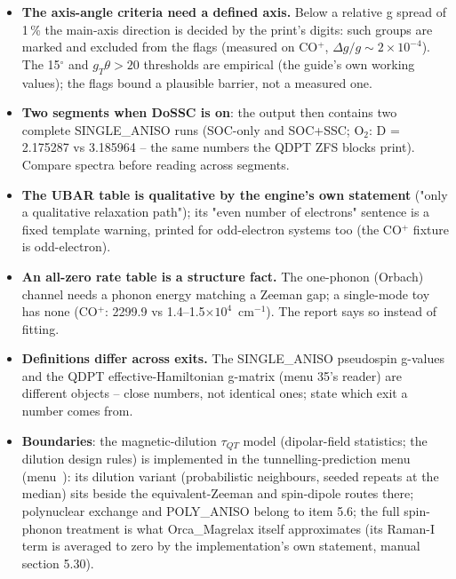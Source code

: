 \begin{readbox}
\begin{itemize}
  \item \textbf{The axis-angle criteria need a defined axis.}  Below a
    relative g spread of 1\,\% the main-axis direction is decided by the
    print's digits: such groups are marked and excluded from the flags
    (measured on CO$^+$, $\Delta g/g \sim 2\times10^{-4}$).  The 15$^\circ$
    and $g_T\theta > 20$ thresholds are empirical (the guide's own
    working values); the flags bound a plausible barrier, not a measured
    one.
  \item \textbf{Two segments when DoSSC is on}: the output then contains
    two complete SINGLE\_ANISO runs (SOC-only and SOC+SSC; O$_2$: D =
    2.175287 vs 3.185964 -- the same numbers the QDPT ZFS blocks print).
    Compare spectra before reading across segments.
  \item \textbf{The UBAR table is qualitative by the engine's own
    statement} ("only a qualitative relaxation path"); its "even number
    of electrons" sentence is a fixed template warning, printed for
    odd-electron systems too (the CO$^+$ fixture is odd-electron).
  \item \textbf{An all-zero rate table is a structure fact.}  The
    one-phonon (Orbach) channel needs a phonon energy matching a Zeeman
    gap; a single-mode toy has none (CO$^+$: 2299.9 vs
    1.4--1.5$\times10^4$~cm$^{-1}$).  The report says so instead of
    fitting.
  \item \textbf{Definitions differ across exits.}  The SINGLE\_ANISO
    pseudospin g-values and the QDPT effective-Hamiltonian g-matrix
    (menu 35's reader) are different objects -- close numbers, not
    identical ones; state which exit a number comes from.
  \item \textbf{Boundaries}: the magnetic-dilution $\tau_{QT}$ model
    (dipolar-field statistics; the dilution design rules) is implemented
    in the tunnelling-prediction menu (menu~): its dilution
    variant (probabilistic neighbours, seeded repeats at the median)
    sits beside the equivalent-Zeeman and spin-dipole routes there;
    polynuclear exchange and POLY\_ANISO belong to item 5.6; the full
    spin-phonon treatment is what Orca\_Magrelax itself approximates
    (its Raman-I term is averaged to zero by the implementation's own
    statement, manual section 5.30).
\end{itemize}
\end{readbox}


